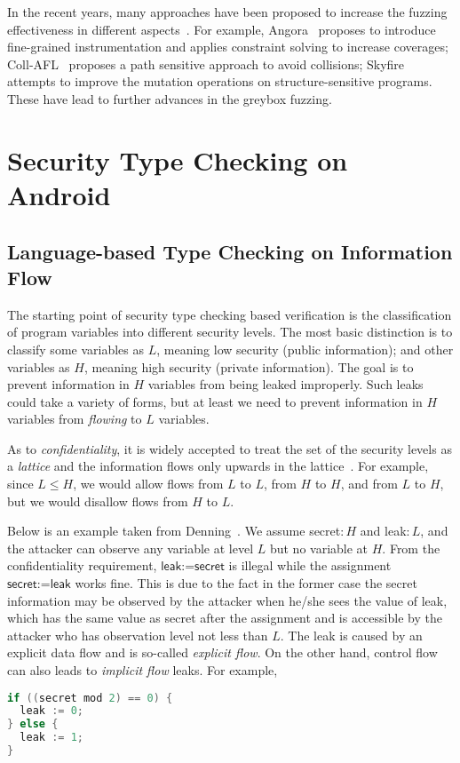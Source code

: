 In the recent years, many approaches have been proposed to increase the fuzzing effectiveness in different aspects~\cite{Bohme:2016:CGF,LiCMLLT17,Bohme:2017:DGF,FairFuzz,CollAFL,Angora,nezha,fuzz_survey}. For example, Angora~\cite{Angora} proposes to introduce fine-grained instrumentation and applies constraint solving to increase coverages; Coll-AFL~\cite{CollAFL} proposes a path sensitive approach to avoid collisions; Skyfire~\cite{junjie:2017sp:skyfire} attempts to improve the mutation operations on structure-sensitive programs. These have lead to further advances in the greybox fuzzing.

\section{Security Type Checking on Android}\label{sec:intro-sta}

\subsection{Language-based Type Checking on Information Flow}

The starting point of security type checking based verification is the classification of program variables into different security levels. The most basic distinction is to classify some variables as $L$, meaning low security (public information); and other variables as $H$, meaning high security (private information). The goal is to prevent information in $H$ variables from being leaked improperly. Such leaks could take a variety of forms, but at least we need to prevent information in $H$ variables from \emph{flowing} to $L$ variables.

As to \emph{confidentiality}, it is widely accepted to treat the set of the security levels as a  \emph{lattice} and the information flows only upwards in the lattice~\cite{Denning:1977hwa}. For example, since $L\leq H$, we would allow flows from $L$ to $L$, from $H$ to $H$, and from $L$ to $H$, but we would disallow flows from $H$ to $L$.

Below is an example taken from Denning~\cite{Denning:1976cl}. We assume \textsf{secret}$:H$ and \textsf{leak}$:L$, and the attacker can observe any variable at level $L$ but no variable at $H$.
From the confidentiality requirement, $\textsf{leak:=secret}$ is illegal while the assignment $\textsf{secret:=leak}$ works fine. This is due to the fact in the former case the secret information may be observed by the attacker when he/she sees the value of \textsf{leak}, which has the same value as \textsf{secret} after the assignment and is accessible by the attacker who has observation level not less than $L$. The leak is caused by an explicit data flow and is so-called \emph{explicit flow}. On the other hand, control flow can also leads to \emph{implicit flow} leaks. For example,
\begin{lstlisting}[language=c,float=h]
if ((secret mod 2) == 0) {
  leak := 0;
} else {
  leak := 1;	
}  
\end{lstlisting}


